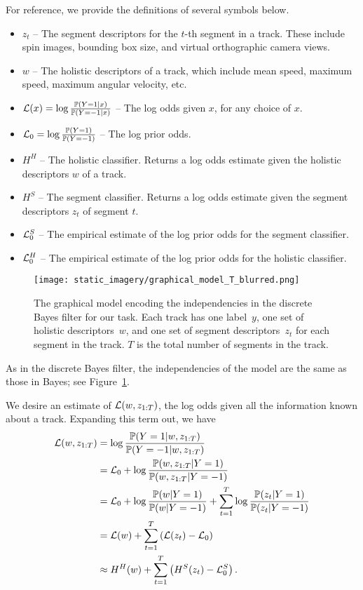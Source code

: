 \documentclass[letterpaper, 10 pt, conference]{ieeeconf}  %
\newcommand{\logodds}[1]{\log \frac{\Pr(Y = 1 | #1)}{\Pr(Y = -1 | #1)}}
\newcommand{\zT}{z_{1:T}}
\begin{document}
\pagebreak
For reference, we provide the definitions of several symbols below.
\begin{itemize}
\item $z_t$ -- The segment descriptors for the $t$-th segment in a track.  These include spin images, bounding box size, and virtual orthographic camera views.
\item $w$ -- The holistic descriptors of a track, which include mean speed, maximum speed, maximum angular velocity, etc.
\item $\L(x) = \logodds{x}$ -- The log odds given $x$, for any choice of $x$.
\item $\mathcal{L}_0 = \log \frac{\mathbb{P}(Y = 1)}{\mathbb{P}(Y = -1)}$ -- The log prior   odds.
\item $H^H$ -- The holistic classifier.  Returns a log odds estimate given the holistic descriptors $w$ of a track.
\item $H^S$ -- The segment classifier.  Returns a log odds estimate given the segment descriptors $z_t$ of segment $t$.
\item $\mathcal{L}_0^S$ -- The empirical estimate of the log prior odds for the segment classifier.
\item $\mathcal{L}_0^H$ -- The empirical estimate of the log prior odds for the holistic classifier.
\end{itemize}

\begin{figure}
  \centering
  \texttt{[image: static\_imagery/graphical\_model\_T\_blurred.png]}
  \caption{The graphical model encoding the independencies in the discrete Bayes filter for our task.  Each track has one label~$y$, one set of holistic descriptors~$w$, and one set of segment descriptors~$z_t$ for each segment in the track.  $T$ is the total number of segments in the track.}
  \label{fig:graph}
\end{figure}

As in the discrete Bayes filter, the independencies of the model are the same as those in \naive Bayes; see Figure~\ref{fig:graph}.

We desire an estimate of $\L(w, \zT)$, the log odds given all the information known about a track.  Expanding this term out, we have
\begin{align}
  \L(w, z_{1:T}) & = \logodds{w, \zT} \notag \\
  & =  \L_0 + \log \frac{\Pr(w, \zT | Y = 1)}{\Pr(w, \zT | Y = -1)} \notag \\
  & = \L_0 + \log \frac{\Pr(w | Y = 1)}{\Pr(w | Y = -1)} + \sum_{t=1}^T \log \frac{\Pr(z_t | Y = 1)}{\Pr(z_t | Y = -1)} \notag \\
  & = \L(w) + \sum_{t=1}^T \left( \L(z_t) - \L_0 \right) \notag \\
  & \approx H^H(w) + \sum_{t=1}^T \left( H^S(z_t) - \L_0^S \right). \label{eqn:ndbf}
\end{align}
\end{document}
